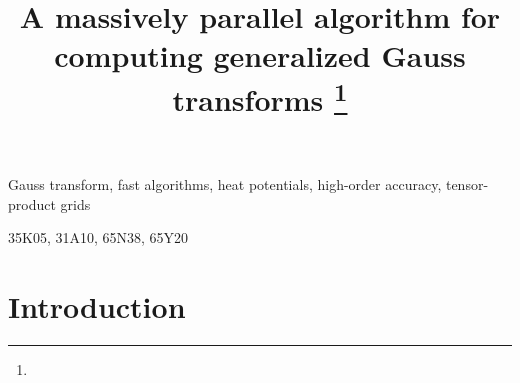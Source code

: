 \documentclass[final]{siamltex}
\begin{document}
\title{A massively parallel algorithm for computing generalized Gauss transforms \thanks{}}
\author{}
\maketitle

\begin{abstract}

\end{abstract}
%
\begin{keywords} 
Gauss transform, fast algorithms, heat potentials, high-order
accuracy, tensor-product grids
\end{keywords}
%
\begin{AMS}
35K05, 31A10, 65N38, 65Y20
\end{AMS}
%


\section{Introduction} \label{sc:intro}


%

%

%

\newpage

%	



\end{document}
